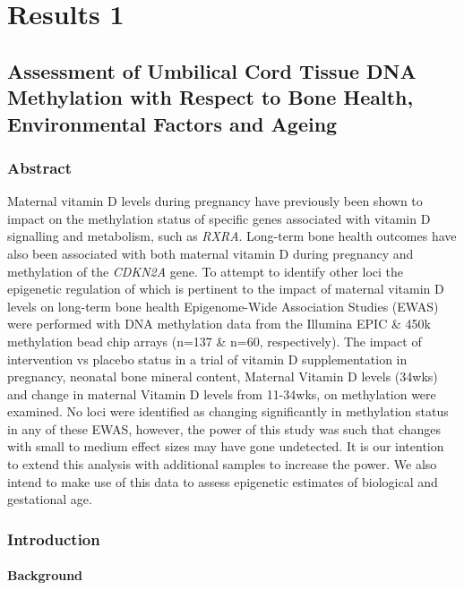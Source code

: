 \documentclass[
]{book}
\begin{document}
\hypertarget{part-results-1}{%
\part{Results 1}\label{part-results-1}}

\hypertarget{MAVIDOS}{%
\chapter{Assessment of Umbilical Cord Tissue DNA Methylation with Respect to Bone Health, Environmental Factors and Ageing}\label{MAVIDOS}}

\hypertarget{abstract-1}{%
\section{Abstract}\label{abstract-1}}

Maternal vitamin D levels during pregnancy have previously been shown to impact on the methylation status of specific genes associated with vitamin D signalling and metabolism, such as \emph{RXRA}.
Long-term bone health outcomes have also been associated with both maternal vitamin D during pregnancy and methylation of the \emph{CDKN2A} gene.
To attempt to identify other loci the epigenetic regulation of which is pertinent to the impact of maternal vitamin D levels on long-term bone health Epigenome-Wide Association Studies (EWAS) were performed with DNA methylation data from the Illumina EPIC \& 450k methylation bead chip arrays (n=137 \& n=60, respectively).
The impact of intervention vs placebo status in a trial of vitamin D supplementation in pregnancy, neonatal bone mineral content, Maternal Vitamin D levels (34wks) and change in maternal Vitamin D levels from 11-34wks, on methylation were examined.
No loci were identified as changing significantly in methylation status in any of these EWAS, however, the power of this study was such that changes with small to medium effect sizes may have gone undetected.
It is our intention to extend this analysis with additional samples to increase the power.
We also intend to make use of this data to assess epigenetic estimates of biological and gestational age.

\hypertarget{introduction}{%
\section{Introduction}\label{introduction}}

\hypertarget{background}{%
\subsection{Background}\label{background}}
\end{document}
